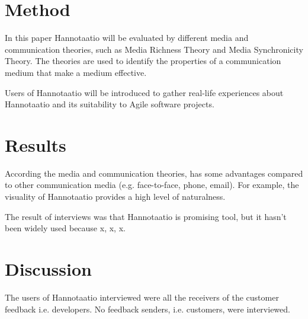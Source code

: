 \documentclass[a4paper]{article}
\begin{document}
\section{Method}
In this paper Hannotaatio will be evaluated by different media and communication theories, such as Media Richness Theory and Media Synchronicity Theory. The theories are used to identify the properties of a communication medium that make a medium effective. 

Users of Hannotaatio will be introduced to gather real-life experiences about Hannotaatio and its suitability to Agile software projects.

\section{Results}
According the media and communication theories, has some advantages compared to other communication media (e.g. face-to-face, phone, email). For example, the visuality of Hannotaatio provides a high level of naturalness.

The result of interviews was that Hannotaatio is promising tool, but it hasn't been widely used because x, x, x.

\section{Discussion}
The users of Hannotaatio interviewed were all the receivers of the customer feedback i.e. developers. No feedback senders, i.e. customers, were interviewed.

\begin{comment}
KEEP IN MIND!
* A thesis is never read from the beginning to the end in a linear way: write each chapter as a “stand-alone”. 
* Make sure your research question, method, and results form a super clear and clean package: this is the question, this is what I did to find an answer, this is the answer. Your Mom should understand it.
* You will spend most of your sweat in the literature review.
* Choose an audience. Your professor is the most important (and perhaps the only) person who will read the thesis, but have also a wider audience in mind (e.g., colleagues, other professionals).
\end{comment}

\end{document}

